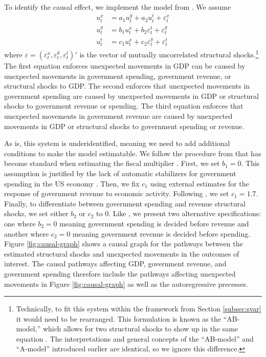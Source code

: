 To identify the causal effect, we implement the model from \textcite{blanchard2002empirical}. We assume
\begin{align*}
    u_t^x &= a_1 u_t^g + a_2 u_t^t + \varepsilon_t^x \\
    u_t^g &= b_1 u_t^x + b_2 \varepsilon_t^t + \varepsilon_t^g \\
    u_t^t &= c_1 u_t^x + c_2 \varepsilon_t^g + \varepsilon_t^t
\end{align*}
where $\varepsilon = (\varepsilon_t^x, \varepsilon_t^g, \varepsilon_t^t)'$ is the vector of mutually uncorrelated structural shocks.\footnote{Technically, to fit this system within the framework from Section \ref{subsec:svar} it would need to be rearranged. This formulation is known as the ``AB-model,'' which allows for two structural shocks to show up in the same equation \parencite{lutkepohl2005new}. The interpretations and general concepts of the ``AB-model'' and ``A-model'' introduced earlier are identical, so we ignore this difference.} The first equation enforces unexpected movements in GDP can be caused by unexpected movements in government spending, government revenue, or structural shocks to GDP. The second enforces that unexpected movements in government spending are caused by unexpected movements in GDP or structural shocks to government revenue or spending. The third equation enforces that unexpected movements in government revenue are caused by unexpected movements in GDP or structural shocks to government spending or revenue.

As is, this system is underidentified, meaning we need to add additional conditions to make the model estimatable. We follow the procedure from \textcite{blanchard2002empirical} that has become standard when estimating the fiscal multiplier \parencites{ramey2011can}{caldara2017analytics}{deleidi2021quantifying}. First, we set $b_1 = 0$. This assumption is justified by the lack of automatic stabilizers for government spending in the US economy \parencites{caldara2017analytics}. Then, we fix $c_1$ using external estimates for the response of government revenue to economic activity. Following \textcite{lutz2010fiscal}, we set $c_1 = 1.7$. Finally, to differentiate between government spending and revenue structural shocks, we set either $b_2$ or $c_2$ to 0. Like \textcite{blanchard2002empirical}, we present two alternative specifications: one where $b_2 = 0$ meaning government spending is decided before revenue and another where $c_2 = 0$ meaning government revenue is decided before spending. Figure \ref{fig:causal-graph} shows a causal graph for the pathways between the estimated structural shocks and unexpected movements in the outcomes of interest. The causal pathways affecting GDP, government revenue, and government spending therefore include the pathways affecting unexpected movements in Figure \ref{fig:causal-graph} as well as the autoregressive precesses.

